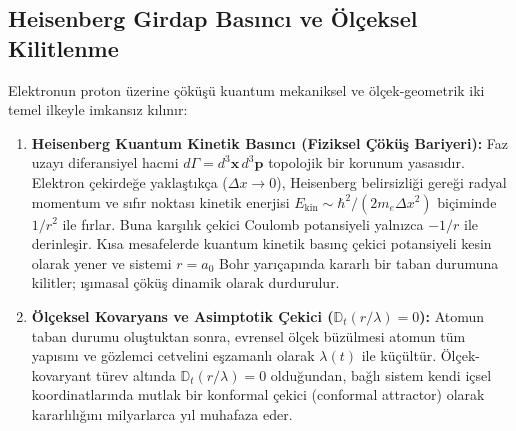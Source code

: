 \subsection{Heisenberg Girdap Basıncı ve Ölçeksel Kilitlenme}
Elektronun proton üzerine çöküşü kuantum mekaniksel ve ölçek-geometrik iki temel ilkeyle imkansız kılınır:
\begin{enumerate}
    \item \textbf{Heisenberg Kuantum Kinetik Basıncı (Fiziksel Çöküş Bariyeri):} Faz uzayı diferansiyel hacmi $d\Gamma = d^3\mathbf{x} \, d^3\mathbf{p}$ topolojik bir korunum yasasıdır. Elektron çekirdeğe yaklaştıkça ($\Delta x \to 0$), Heisenberg belirsizliği gereği radyal momentum ve sıfır noktası kinetik enerjisi $E_{\mathrm{kin}} \sim \hbar^2 / (2m_e \Delta x^2)$ biçiminde $1/r^2$ ile fırlar. Buna karşılık çekici Coulomb potansiyeli yalnızca $-1/r$ ile derinleşir. Kısa mesafelerde kuantum kinetik basınç çekici potansiyeli kesin olarak yener ve sistemi $r = a_0$ Bohr yarıçapında kararlı bir taban durumuna kilitler; ışımasal çöküş dinamik olarak durdurulur.
    \item \textbf{Ölçeksel Kovaryans ve Asimptotik Çekici ($\mathbb{D}_t(r/\lambda) = 0$):} Atomun taban durumu oluştuktan sonra, evrensel ölçek büzülmesi atomun tüm yapısını ve gözlemci cetvelini eşzamanlı olarak $\lambda(t)$ ile küçültür. Ölçek-kovaryant türev altında $\mathbb{D}_t(r/\lambda) = 0$ olduğundan, bağlı sistem kendi içsel koordinatlarında mutlak bir konformal çekici (conformal attractor) olarak kararlılığını milyarlarca yıl muhafaza eder.
\end{enumerate}

